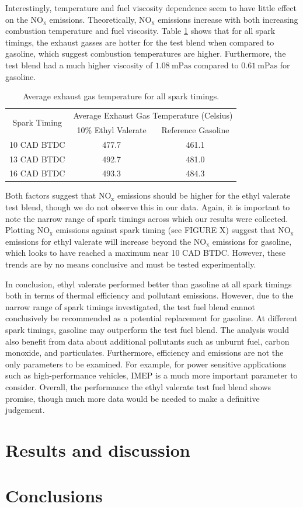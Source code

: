 \documentclass[11pt]{article}
\begin{document}
Interestingly, temperature and fuel viscosity dependence seem to have little effect on the $\text{NO}_{\text{x}}$ emissions. Theoretically, $\text{NO}_{\text{x}}$ emissions increase with both increasing combustion temperature and fuel viscosity. Table \ref{q7-t1} shows that for all spark timings, the exhaust gasses are hotter for the test blend when compared to gasoline, which suggest combustion temperatures are higher. Furthermore, the test blend had a much higher viscosity of $\SI{1.08}{\milli\pascal\second}$ compared to $\SI{0.61}{\milli\pascal\second}$ for gasoline. 
\begin{table}[H]
	\begin{center}
	\begin{tabular}{c c c}
		\toprule
		\multirow{2}{*}{Spark Timing} & \multicolumn{2}{c}{Average Exhaust Gas Temperature (Celsius)} \\
		\cmidrule{2-3} & 10\% Ethyl Valerate & Reference Gasoline \\
		\midrule
		10 CAD BTDC & 477.7 & 461.1 \\
		13 CAD BTDC & 492.7 & 481.0 \\
		16 CAD BTDC & 493.3 & 484.3 \\
		\bottomrule
	\end{tabular}
	\caption{Average exhaust gas temperature for all spark timings.}
	\label{q7-t1}
	\end{center}
\end{table}
Both factors suggest that $\text{NO}_{\text{x}}$ emissions should be higher for the ethyl valerate test blend, though we do not observe this in our data. Again, it is important to note the narrow range of spark timings across which our results were collected. Plotting $\text{NO}_{\text{x}}$ emissions against spark timing (see FIGURE X) suggest that $\text{NO}_{\text{x}}$ emissions for ethyl valerate will increase beyond the $\text{NO}_{\text{x}}$ emissions for gasoline, which looks to have reached a maximum near 10 CAD BTDC. However, these trends are by no means conclusive and must be tested experimentally.

In conclusion, ethyl valerate performed better than gasoline at all spark timings both in terms of thermal efficiency and pollutant emissions. However, due to the narrow range of spark timings investigated, the test fuel blend cannot conclusively be recommended as a potential replacement for gasoline. At different spark timings, gasoline may outperform the test fuel blend. The analysis would also benefit from data about additional pollutants such as unburnt fuel, carbon monoxide, and particulates. Furthermore, efficiency and emissions are not the only parameters to be examined. For example, for power sensitive applications such as high-performance vehicles, IMEP is a much more important parameter to consider. Overall, the performance the ethyl valerate test fuel blend shows promise, though much more data would be needed to make a definitive judgement. 
\section*{Results and discussion}
\section*{Conclusions}
\begin{thebibliography}{00}

\end{thebibliography}
\end{document}
